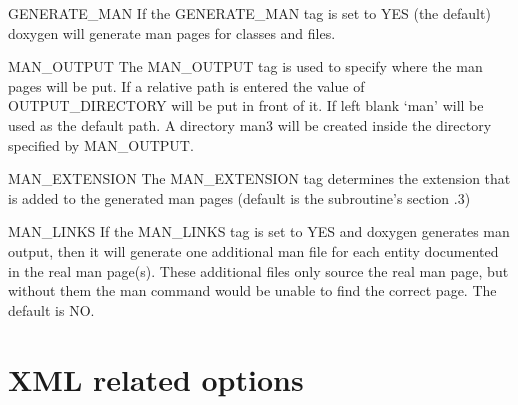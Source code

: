 \begin{DoxyDescription}
\item[{\ttfamily GENERATE\_\-MAN} ] If the {\ttfamily GENERATE\_\-MAN} tag is set to {\ttfamily YES} (the default) doxygen will generate man pages for classes and files.

\label{config_cfg_man_output}
\hypertarget{config_cfg_man_output}{}
 
\item[{\ttfamily MAN\_\-OUTPUT} ] The {\ttfamily MAN\_\-OUTPUT} tag is used to specify where the man pages will be put. If a relative path is entered the value of {\ttfamily OUTPUT\_\-DIRECTORY} will be put in front of it. If left blank `man' will be used as the default path. A directory man3 will be created inside the directory specified by {\ttfamily MAN\_\-OUTPUT}.

\label{config_cfg_man_extension}
\hypertarget{config_cfg_man_extension}{}
 
\item[{\ttfamily MAN\_\-EXTENSION} ] The {\ttfamily MAN\_\-EXTENSION} tag determines the extension that is added to the generated man pages (default is the subroutine's section .3)

\label{config_cfg_man_links}
\hypertarget{config_cfg_man_links}{}
 
\item[{\ttfamily MAN\_\-LINKS} ] If the {\ttfamily MAN\_\-LINKS} tag is set to {\ttfamily YES} and doxygen generates man output, then it will generate one additional man file for each entity documented in the real man page(s). These additional files only source the real man page, but without them the man command would be unable to find the correct page. The default is {\ttfamily NO}.


\end{DoxyDescription}\hypertarget{config_xml_output}{}\section{XML related options}\label{config_xml_output}
\label{config_cfg_generate_xml}
\hypertarget{config_cfg_generate_xml}{}
 
